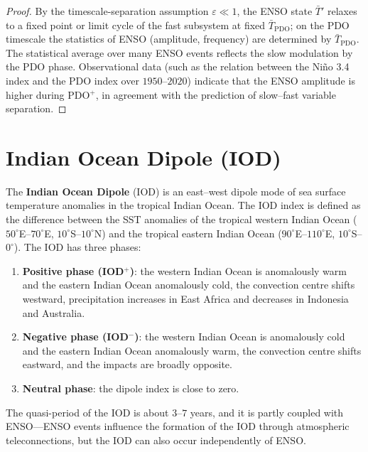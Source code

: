 \begin{proof}
By the timescale-separation assumption $\varepsilon \ll 1$, the ENSO state $\bar{T}'$ relaxes to a fixed point or limit cycle of the fast subsystem at fixed $\bar{T}_{\text{PDO}}$; on the PDO timescale the statistics of ENSO (amplitude, frequency) are determined by $\bar{T}_{\text{PDO}}$. The statistical average over many ENSO events reflects the slow modulation by the PDO phase. Observational data (such as the relation between the Niño 3.4 index and the PDO index over $1950$--$2020$) indicate that the ENSO amplitude is higher during PDO$^+$, in agreement with the prediction of slow--fast variable separation.
\end{proof}

\section{Indian Ocean Dipole (IOD)}

\begin{definition}\label{def:iod}
The \textbf{Indian Ocean Dipole} (IOD) is an east--west dipole mode of sea surface temperature anomalies in the tropical Indian Ocean. The IOD index is defined as the difference between the SST anomalies of the tropical western Indian Ocean ($50^\circ$E--$70^\circ$E, $10^\circ$S--$10^\circ$N) and the tropical eastern Indian Ocean ($90^\circ$E--$110^\circ$E, $10^\circ$S--$0^\circ$). The IOD has three phases:
\begin{enumerate}[label=(\roman*)]
    \item \textbf{Positive phase (IOD$^+$)}: the western Indian Ocean is anomalously warm and the eastern Indian Ocean anomalously cold, the convection centre shifts westward, precipitation increases in East Africa and decreases in Indonesia and Australia.
    \item \textbf{Negative phase (IOD$^-$)}: the western Indian Ocean is anomalously cold and the eastern Indian Ocean anomalously warm, the convection centre shifts eastward, and the impacts are broadly opposite.
    \item \textbf{Neutral phase}: the dipole index is close to zero.
\end{enumerate}
The quasi-period of the IOD is about $3$--$7$ years, and it is partly coupled with ENSO---ENSO events influence the formation of the IOD through atmospheric teleconnections, but the IOD can also occur independently of ENSO.
\end{definition}

